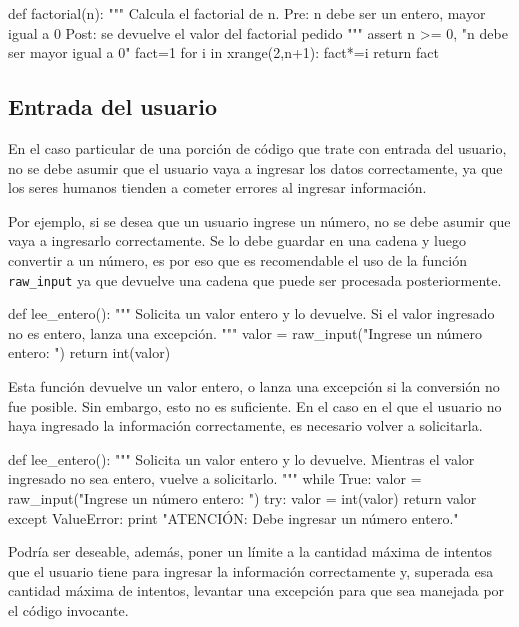 \begin{codigo-python}
def factorial(n):
	""" Calcula el factorial de n.
	Pre: n debe ser un entero, mayor igual a 0
	Post: se devuelve el valor del factorial pedido
	"""
	assert n >= 0, "n debe ser mayor igual a 0"
	fact=1
	for i in xrange(2,n+1):
		fact*=i
	return fact
\end{codigo-python}

\subsection{Entrada del usuario}

En el caso particular de una porción de código que trate con entrada del
usuario, no se debe asumir que el usuario vaya a ingresar los datos
correctamente, ya que los seres humanos tienden a cometer errores al ingresar
información.

Por ejemplo, si se desea que un usuario ingrese un número, no se debe asumir
que vaya a ingresarlo correctamente. Se lo debe guardar en una cadena y luego
convertir a un número, es por eso que es recomendable el uso de la
función \lstinline!raw_input! ya que devuelve una cadena que puede ser
procesada posteriormente.

\begin{codigo-python-sn}
def lee_entero():
    """ Solicita un valor entero y lo devuelve.
        Si el valor ingresado no es entero, lanza una excepción. """
    valor = raw_input("Ingrese un número entero: ")
    return int(valor)
\end{codigo-python-sn}

Esta función devuelve un valor entero, o lanza una excepción si la conversión
no fue posible.  Sin embargo, esto no es suficiente.  En el caso en el que el
usuario no haya ingresado la información correctamente, es necesario volver a
solicitarla.

\begin{codigo-python-sn}
def lee_entero():
    """ Solicita un valor entero y lo devuelve.
        Mientras el valor ingresado no sea entero, vuelve a solicitarlo. """
    while True:
        valor = raw_input("Ingrese un número entero: ")
		try:
			valor = int(valor)
            return valor
        except ValueError:
            print "ATENCIÓN: Debe ingresar un número entero."
\end{codigo-python-sn}

Podría ser deseable, además, poner un límite a la cantidad máxima de intentos
que el usuario tiene para ingresar la información correctamente y, superada
esa cantidad máxima de intentos, levantar una excepción para que sea manejada
por el código invocante.

